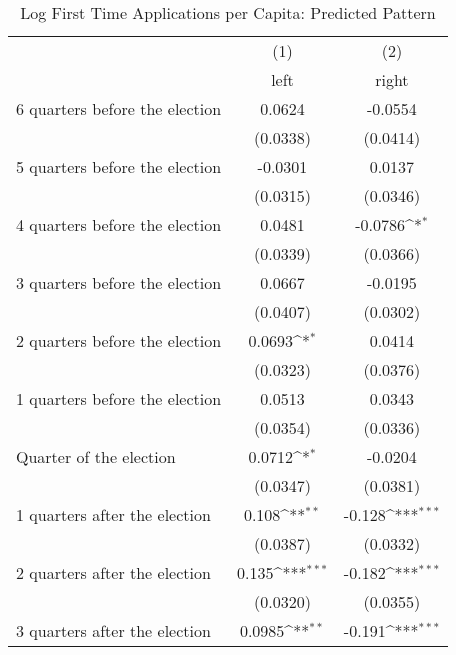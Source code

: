 \begin{table}[htbp]\centering
\def\sym#1{\ifmmode^{#1}\else\(^{#1}\)\fi}
\caption{Log First Time Applications per Capita: Predicted Pattern}
\begin{tabular}{l*{2}{c}}
\hline\hline
                    &\multicolumn{1}{c}{(1)}&\multicolumn{1}{c}{(2)}\\
                    &\multicolumn{1}{c}{left}&\multicolumn{1}{c}{right}\\
\hline
 6 quarters before the election&      0.0624         &     -0.0554         \\
                    &    (0.0338)         &    (0.0414)         \\
[1em]
 5 quarters before the election&     -0.0301         &      0.0137         \\
                    &    (0.0315)         &    (0.0346)         \\
[1em]
 4 quarters before the election&      0.0481         &     -0.0786\sym{*}  \\
                    &    (0.0339)         &    (0.0366)         \\
[1em]
 3 quarters before the election&      0.0667         &     -0.0195         \\
                    &    (0.0407)         &    (0.0302)         \\
[1em]
 2 quarters before the election&      0.0693\sym{*}  &      0.0414         \\
                    &    (0.0323)         &    (0.0376)         \\
[1em]
 1 quarters before the election&      0.0513         &      0.0343         \\
                    &    (0.0354)         &    (0.0336)         \\
[1em]
Quarter of the election&      0.0712\sym{*}  &     -0.0204         \\
                    &    (0.0347)         &    (0.0381)         \\
[1em]
 1 quarters after the election&       0.108\sym{**} &      -0.128\sym{***}\\
                    &    (0.0387)         &    (0.0332)         \\
[1em]
 2 quarters after the election&       0.135\sym{***}&      -0.182\sym{***}\\
                    &    (0.0320)         &    (0.0355)         \\
[1em]
 3 quarters after the election&      0.0985\sym{**} &      -0.191\sym{***}\\

\end{tabular}
\end{table}
